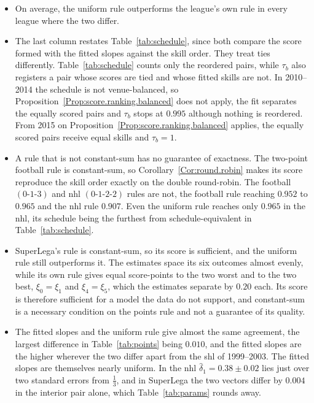\documentclass[letterpaper,12pt]{article}
\begin{document}
\begin{itemize}
\item On average, the uniform rule outperforms the league's own rule in every league
where the two differ.

\item The last column restates Table~\ref{tab:schedule}, since both compare the score
formed with the fitted slopes against the skill order. They treat ties differently.
Table~\ref{tab:schedule} counts only the reordered pairs, while $\tau_b$ also registers a
pair whose scores are tied and whose fitted skills are not. In 2010--2014 the schedule is
not venue-balanced, so Proposition~\ref{Prop:score.ranking.balanced} does not apply, the
fit separates the equally scored pairs and $\tau_b$ stops at $0.995$ although nothing is
reordered. From 2015 on Proposition~\ref{Prop:score.ranking.balanced} applies, the equally scored pairs receive equal skills and $\tau_b=1$.

\item A rule that is not constant-sum has no guarantee of exactness. The two-point
football rule is constant-sum, so Corollary~\ref{Cor:round.robin} makes its score
reproduce the skill order exactly on the double round-robin. The football
$(0\text{-}1\text{-}3)$ and \gls{nhl} $(0\text{-}1\text{-}2\text{-}2)$ rules are not, the
football rule reaching $0.952$ to $0.965$ and the \gls{nhl} rule $0.907$. Even the uniform
rule reaches only $0.965$ in the \gls{nhl}, its schedule being the furthest from
schedule-equivalent in Table~\ref{tab:schedule}.

\item SuperLega's rule is constant-sum, so its score is sufficient, and the uniform rule
still outperforms it. The estimates space its six outcomes almost evenly, while its own rule gives
equal score-points to the two worst and to the two best, $\xi_0=\xi_1$ and
$\xi_4=\xi_5$, which the estimates separate by $0.20$ each. Its score is therefore
sufficient for a model the data do not support, and constant-sum is a necessary condition
on the points rule and not a guarantee of its quality.

\item The fitted slopes and the uniform rule give almost the same agreement, the largest
difference in Table~\ref{tab:points} being $0.010$, and the fitted slopes are the higher
wherever the two differ apart from the \gls{shl} of 1999--2003. The fitted slopes are
themselves nearly uniform. In the \gls{nhl} $\hat\delta_1=0.38\pm0.02$ lies just over two standard
errors from $\tfrac13$, and in SuperLega the two vectors differ by $0.004$ in the interior
pair alone, which Table~\ref{tab:params} rounds away.

\end{itemize}
\end{document}
